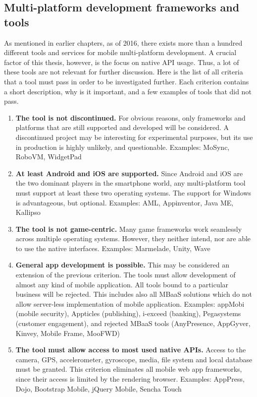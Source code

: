 \documentclass[english,master,public,dept460,male,cpdeclaration,oneside]{diploma}
\begin{document}
\subsection{Multi-platform development frameworks and tools}
As mentioned in earlier chapters, as of 2016, there exists more than a hundred different tools and services for mobile multi-platform development. A crucial factor of this thesis, however, is the focus on native API usage. Thus, a lot of these tools are not relevant for further discussion. Here is the list of all criteria that a tool must pass in order to be investigated further. Each criterion contains a short description, why is it important, and a few examples of tools that did not pass.
\begin{enumerate}
	\item \textbf{The tool is not discontinued.}
	For obvious reasons, only frameworks and platforms that are still supported and developed will be considered. A discontinued project may be interesting for experimental purposes, but its use in production is highly unlikely, and questionable.
	Examples: MoSync, RoboVM, WidgetPad
	\item \textbf{At least Android and iOS are supported.}
	Since Android and iOS are the two dominant players in the smartphone world, any multi-platform tool must support at least these two operating systems. The support for Windows is advantageous, but optional. 
	Examples: AML, Appinventor, Java ME, Kallipso
	\item \textbf{The tool is not game-centric.}
	Many game frameworks work seamlessly across multiple operating systems. However, they neither intend, nor are able to use the native interfaces.
	Examples: Marmelade, Unity, Wave
	\item \textbf{General app development is possible.}
	This may be considered an extension of the previous criterion. The tools must allow development of almost any kind of mobile application. All tools bound to a particular business will be rejected. This includes also all MBaaS solutions which do not allow server-less implementation of mobile application.
	Examples: appMobi (mobile security), Appticles (publishing), i-exceed (banking), Pegasystems (customer engagement), and rejected MBaaS tools (AnyPresence, AppGyver, Kinvey, Mobile Frame, MooFWD)
	\item \textbf{The tool must allow access to most used native APIs.}
	Access to the camera, GPS, accelerometer, gyroscope, media, file system and local database must be granted. This criterion eliminates all mobile web app frameworks, since their access is limited by the rendering browser.
	Examples: AppPress, Dojo, Bootstrap Mobile, jQuery Mobile, Sencha Touch
\end{enumerate}
\end{document}

